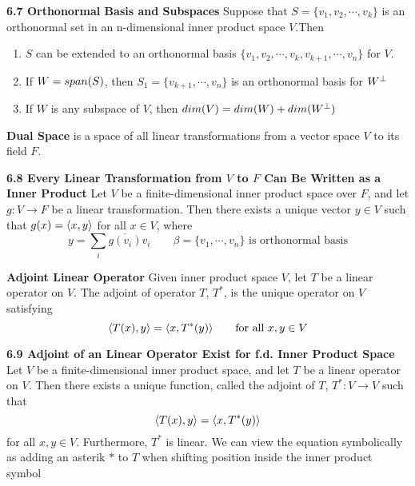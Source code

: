 \documentclass[11pt]{article}
\begin{document}
\begin{theorem*}
    \textbf{6.7 Orthonormal Basis and Subspaces} Suppose that $S = \{v_1,v_2,\cdots, v_k\}$ is an orthonormal set in an n-dimensional inner product space $V$.Then 
    \begin{enumerate}
        \item $S$ can be extended to an orthonormal basis $\{v_1,v_2,\cdots, v_k, v_{k+1}, \cdots, v_n\}$ for $V$. 
        \item If $W = span(S)$, then $S_1 = \{v_{k+1}, \cdots, v_n\}$ is an orthonormal basis for $W^{\perp}$ 
        \item If $W$ is any subspace of $V$, then $dim(V) = dim(W) + dim(W^{\perp})$
    \end{enumerate}
\end{theorem*}


\begin{defn*}
    \textbf{Dual Space} is a space of all linear transformations from a vector space $V$ to its field $F$. 
\end{defn*}

\begin{theorem*}
    \textbf{6.8 Every Linear Transformation from $V$ to $F$ Can Be Written as a Inner Product} Let $V$ be a finite-dimensional inner product space over $F$, and let $g: V\to F$ be a linear transformation. Then there exists a unique vector $y\in V$ such that $g(x) = \langle x,y\rangle$ for all $x\in V$, where
    \[
        y = \sum_i \overline{g(v_i)} v_i \qquad \text{$\beta = \{ v_1,\cdots , v_n \}$ is orthonormal basis}
    \]
\end{theorem*}


\begin{defn*}
    \textbf{Adjoint Linear Operator} Given inner product space $V$, let $T$ be a linear operator on $V$. The adjoint of operator $T$, $T^*$, is the unique operator on $V$ satisfying 
    \[
        \langle T(x),y\rangle = \langle x,T^*(y)\rangle    
        \qquad \text{for all $x,y\in V$}
    \]
\end{defn*}

\begin{theorem*}
    \textbf{6.9 Adjoint of an Linear Operator Exist for f.d. Inner Product Space} Let $V$ be a finite-dimensional inner product space, and let $T$ be a linear operator on $V$. Then there exists a unique function, called the adjoint of $T$, $T^*: V\to V$ such that
    \[
        \langle T(x),y\rangle = \langle x,T^*(y)\rangle    
    \]
    for all $x,y\in V$. Furthermore, $T^*$ is linear. We can view the equation symbolically as adding an asterik $*$ to $T$  when shifting position inside the inner product symbol
\end{theorem*}
\end{document}
